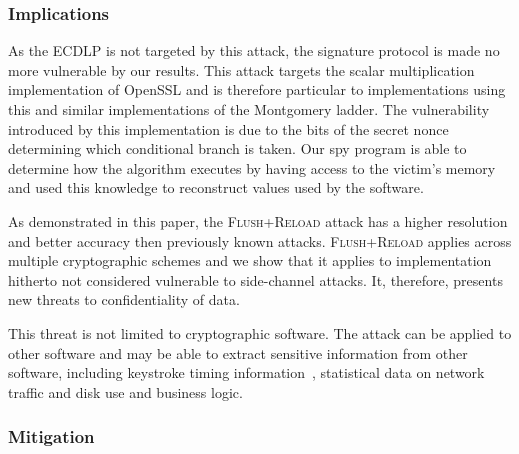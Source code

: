 \documentclass[twocolumn]{svjour3}
\newcommand{\fl}{\textsc{Flu\-sh+\allowbreak Re\-load}\xspace}
\newcommand{\myupcase}[1]{\uppercase{#1}}
\begin{document}

\subsubsection*{Implications}

As the \myupcase{ecdlp} is not targeted by this attack, the signature protocol is made no more vulnerable by our results. 
This attack targets the scalar multiplication implementation of OpenSSL and is therefore particular to implementations using this and similar implementations of the Montgomery ladder. The vulnerability introduced by this implementation is due to the bits of the secret nonce determining which conditional branch is taken. 
Our spy program is able to determine how the algorithm executes by having access to the victim's memory and used this knowledge to reconstruct values used by the software.


As demonstrated in this paper, the \fl attack  has a higher resolution and  better accuracy then previously known attacks.
\fl applies across multiple cryptographic schemes and we show that it applies
to implementation hitherto not considered vulnerable to side-channel attacks.
It, therefore, presents new threats to confidentiality of data.

This threat is not limited to cryptographic software.
The attack can be applied to other software and may be able to extract sensitive information from other software,
including keystroke timing information~\cite{song01timing,ristenpart09hey}, statistical data on network traffic and disk use
and business logic.

\subsubsection*{Mitigation}

\end{document}
